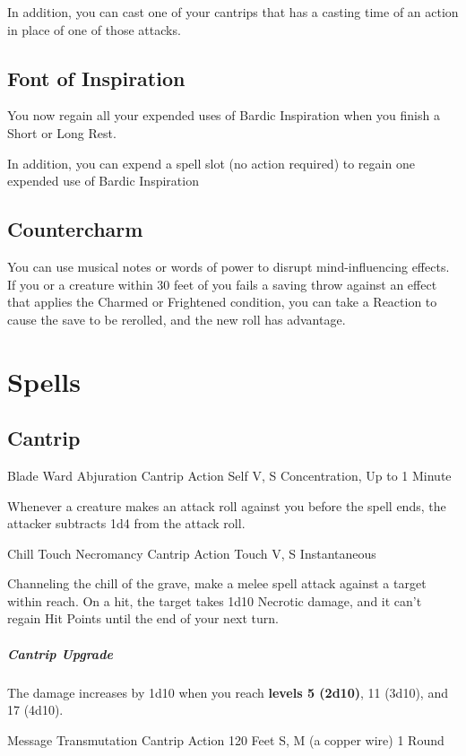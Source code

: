 \documentclass[letterpaper,openany,oneside,twocolumn]{book}
\begin{document}
In addition, you can cast one of your cantrips that has a casting time of an action in place of one of those attacks.

\subsection*{Font of Inspiration}
You now regain all your expended uses of Bardic Inspiration when you finish a Short or Long Rest.

In addition, you can expend a spell slot (no action required) to regain one expended use of Bardic Inspiration

\subsection*{Countercharm}
You can use musical notes or words of power to disrupt mind-influencing effects. If you or a creature within 30 feet of you fails a saving throw against an effect that applies the Charmed or Frightened condition, you can take a Reaction to cause the save to be rerolled, and the new roll has advantage.

\section*{Spells}
\subsection*{Cantrip}

\DndSpellHeader
  {Blade Ward}
  {Abjuration Cantrip}
  {Action}
  {Self}
  {V, S}
  {Concentration, Up to 1 Minute}

Whenever a creature makes an attack roll against you before the spell ends, the attacker subtracts 1d4 from the attack roll.

\DndSpellHeader
  {Chill Touch}
  {Necromancy Cantrip}
  {Action}
  {Touch}
  {V, S}
  {Instantaneous}

Channeling the chill of the grave, make a melee spell attack against a target within reach. On a hit, the target takes 1d10 Necrotic damage, and it can't regain Hit Points until the end of your next turn.

\subparagraph*{Cantrip Upgrade} The damage increases by 1d10 when you reach \textbf{levels 5 (2d10)}, 11 (3d10), and 17 (4d10).

\DndSpellHeader
  {Message}
  {Transmutation Cantrip}
  {Action}
  {120 Feet}
  {S, M (a copper wire)}
  {1 Round}
\end{document}
